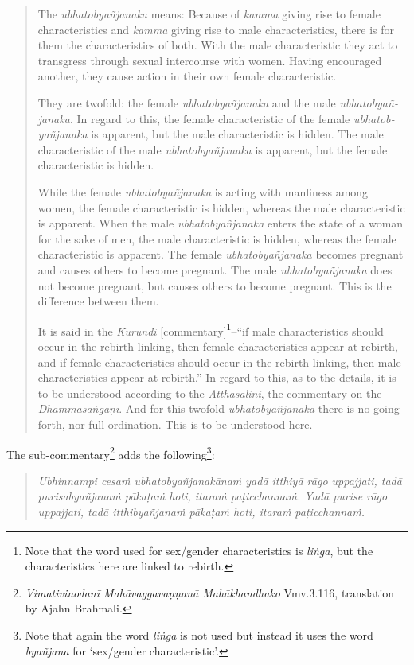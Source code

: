 \begin{quote}
The \textit{ubhatob­yañ­janaka} means: Because of \textit{kamma} giving rise to female characteristics and \textit{kamma} giving rise to male characteristics, there is for them the characteristics of both. With the male characteristic they act to transgress through sexual intercourse with women. Having encouraged another, they cause action in their own female characteristic. 

They are twofold: the female \textit{ubhatob­yañ­janaka} and the male \textit{ubhatob­yañ­janaka}. In regard to this, the female characteristic of the female \textit{ubhatob­yañ­janaka} is apparent, but the male characteristic is hidden. The male characteristic of the male \textit{ubhatob­yañ­janaka} is apparent, but the female characteristic is hidden. 

While the female \textit{ubhatob­yañ­janaka} is acting with manliness among women, the female characteristic is hidden, whereas the male characteristic is apparent. 
When the male \textit{ubhatob­yañ­janaka} enters the state of a woman for the sake of men, the male characteristic is hidden, whereas the female characteristic is apparent. 
The female \textit{ubhatob­yañ­janaka} becomes pregnant and causes others to become pregnant. The male \textit{ubhatob­yañ­janaka} does not become pregnant, but causes others to become pregnant. This is the difference between them.

It is said in the \textit{Kurundi} [commentary]\footnote{Note that the word used for sex/gender characteristics is \textit{liṅga}, but the characteristics here are linked to rebirth.}--``if male characteristics should occur in the rebirth-linking, then female characteristics appear at rebirth, and if female characteristics should occur in the rebirth-linking, then male characteristics appear at rebirth.'' In regard to this, as to the details, it is to be understood according to the \textit{Atthasālini}, the commentary on the \textit{Dhammasaṅgaṇī}. And for this twofold \textit{ubhatobyañjanaka} there is no going forth, nor full ordination. This is to be understood here.
\end{quote}

The sub-commentary\footnote{\textit{Vimativinodanī Mahāvaggavaṇṇanā Mahākhandhako} Vmv.3.116, translation by Ajahn Brahmali.} adds the following\footnote{Note that again the word \textit{liṅga} is not used but instead it uses the word \textit{byañjana} for `sex/gender characteristic'.}: 
\begin{quote}
\textit{Ubhinnampi cesaṁ ubhatobyañjanakānaṁ yadā itthiyā rāgo uppajjati, tadā purisabyañjanaṁ pākaṭaṁ hoti, itaraṁ paṭicchannaṁ. Yadā purise rāgo uppajjati, tadā itthibyañjanaṁ pākaṭaṁ hoti, itaraṁ paṭicchannaṁ.}
\end{quote}


